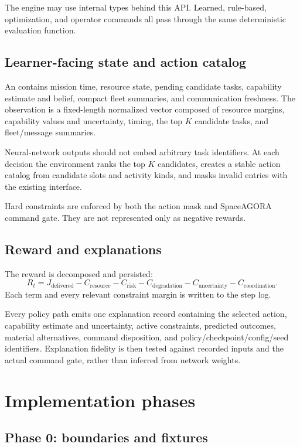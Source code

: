 \documentclass[11pt]{article}
\newcommand{\code}[1]{\texttt{\detokenize{#1}}}
\begin{document}
The engine may use internal types behind this API.  Learned, rule-based,
optimization, and operator commands all pass through the same deterministic
evaluation function.

\subsection{Learner-facing state and action catalog}

An \code{EODecisionState} contains mission time, resource state, pending
candidate tasks, capability estimate and belief, compact fleet summaries, and
communication freshness.  The observation is a fixed-length normalized vector
composed of resource margins, capability values and uncertainty, timing, the
top $K$ candidate tasks, and fleet/message summaries.

Neural-network outputs should not embed arbitrary task identifiers.  At each
decision the environment ranks the top $K$ candidates, creates a stable action
catalog from candidate slots and activity kinds, and masks invalid entries
with the existing \code{valid_action_mask} interface.

Hard constraints are enforced by both the action mask and SpaceAGORA command
gate.  They are not represented only as negative rewards.

\subsection{Reward and explanations}

The reward is decomposed and persisted:
\[
R_t=J_{\mathrm{delivered}}
-C_{\mathrm{resource}}
-C_{\mathrm{risk}}
-C_{\mathrm{degradation}}
-C_{\mathrm{uncertainty}}
-C_{\mathrm{coordination}}.
\]
Each term and every relevant constraint margin is written to the step log.

Every policy path emits one explanation record containing the selected action,
capability estimate and uncertainty, active constraints, predicted outcomes,
material alternatives, command disposition, and policy/checkpoint/config/seed
identifiers.  Explanation fidelity is then tested against recorded inputs and
the actual command gate, rather than inferred from network weights.

\section{Implementation phases}

\subsection{Phase 0: boundaries and fixtures}
\end{document}
